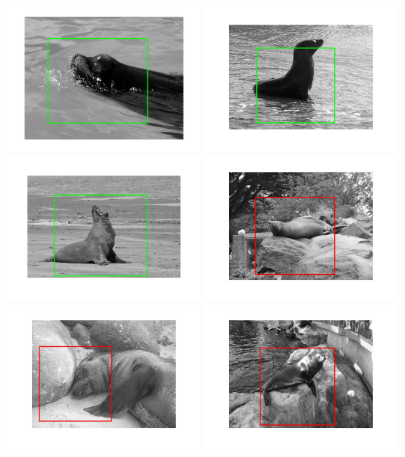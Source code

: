 \documentclass[10pt,twocolumn,letterpaper]{article}
\begin{document}
\begin{figure}
\begin{center}
    \includegraphics[width=2in]{loc_sl_1.jpg}
    \includegraphics[width=2in]{loc_sl_2.jpg}
    \includegraphics[width=2in]{loc_sl_3.jpg}
    \includegraphics[width=2in]{loc_sl_4.jpg}
    \includegraphics[width=2in]{loc_sl_5.jpg}
    \includegraphics[width=2in]{loc_sl_6.jpg}

\end{center}
\end{figure}
\end{document}

